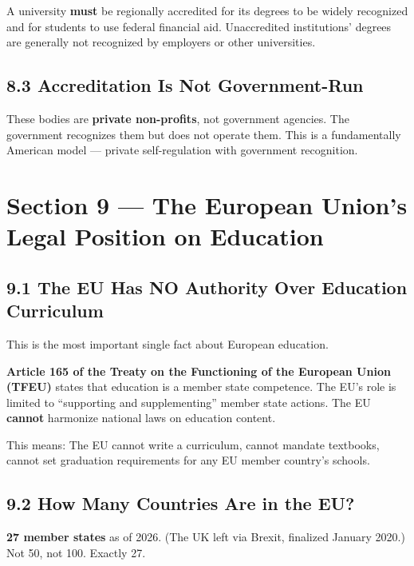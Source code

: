 	A university \textbf{must} be regionally accredited for its degrees to be widely recognized and for students to use federal financial aid. Unaccredited institutions' degrees are generally not recognized by employers or other universities.

	\subsection{8.3 Accreditation Is Not Government-Run}

	These bodies are \textbf{private non-profits}, not government agencies. The government recognizes them but does not operate them. This is a fundamentally American model --- private self-regulation with government recognition.


\clearpage
{}


	\section{Section 9 --- The European Union's Legal Position on Education}

	\subsection{9.1 The EU Has NO Authority Over Education Curriculum}

	This is the most important single fact about European education.

	\textbf{Article 165 of the Treaty on the Functioning of the European Union (TFEU)} states that education is a member state competence. The EU's role is limited to ``supporting and supplementing'' member state actions. The EU \textbf{cannot} harmonize national laws on education content.

	This means: The EU cannot write a curriculum, cannot mandate textbooks, cannot set graduation requirements for any EU member country's schools.

	\subsection{9.2 How Many Countries Are in the EU?}

	\textbf{27 member states} as of 2026. (The UK left via Brexit, finalized January 2020.) Not 50, not 100. Exactly 27.

